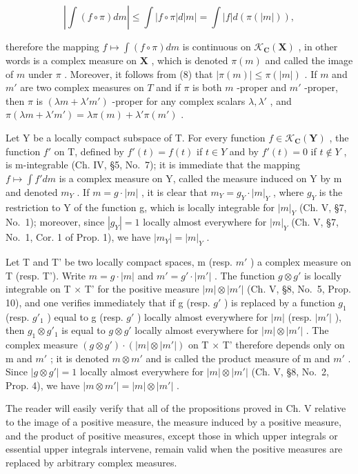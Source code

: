 \[
\left| \int (f \circ \pi) d m \right| \leqslant \int | f \circ \pi | d | m | = \int | f | d (\pi (| m |)),\tag{8}
\]

therefore the mapping \(f \mapsto \int (f \circ \pi) dm\) is continuous on \(\mathcal{K}_{\mathbf{C}}(\mathbf{X})\) , in other words is a complex measure on \(\mathbf{X}\) , which is denoted \(\pi(m)\) and called the image of \(m\) under \(\pi\) . Moreover, it follows from (8) that \(|\pi(m)| \leqslant \pi(|m|)\) . If \(m\) and \(m'\) are two complex measures on \(T\) and if \(\pi\) is both \(m\) -proper and \(m'\) -proper, then \(\pi\) is \((\lambda m + \lambda'm')\) -proper for any complex scalars \(\lambda, \lambda'\) , and \(\pi(\lambda m + \lambda'm') = \lambda\pi(m) + \lambda'\pi(m')\) .

Let Y be a locally compact subspace of T. For every function \(f \in \mathcal{K}_{\mathbf{C}}(\mathbf{Y})\) , the function \(f'\) on T, defined by \(f'(t) = f(t)\) if \(t \in Y\) and by \(f'(t) = 0\) if \(t \notin Y\) , is m-integrable (Ch. IV, §5, No.~7); it is immediate that the mapping \(f \mapsto \int f' dm\) is a complex measure on Y, called the measure induced on Y by m and denoted \(m_{Y}\) . If \(m = g \cdot |m|\) , it is clear that \(m_{Y} = g_{Y} \cdot |m|_{Y}\) , where \(g_{Y}\) is the restriction to Y of the function g, which is locally integrable for \(|m|_{Y}\) (Ch. V, §7, No.~1); moreover, since \(|g_{Y}| = 1\) locally almost everywhere for \(|m|_{Y}\) (Ch. V, §7, No.~1, Cor. 1 of Prop. 1), we have \(|m_{Y}| = |m|_{Y}\) .

Let T and T' be two locally compact spaces, m (resp. \(m'\) ) a complex measure on T (resp. T'). Write \(m = g \cdot |m|\) and \(m' = g' \cdot |m'|\) . The function \(g \otimes g'\) is locally integrable on T × T' for the positive measure \(|m| \otimes |m'|\) (Ch. V, §8, No.~5, Prop. 10), and one verifies immediately that if g (resp. \(g'\) ) is replaced by a function \(g_1\) (resp. \(g'_1\) ) equal to g (resp. \(g'\) ) locally almost everywhere for \(|m|\) (resp. \(|m'|\) ), then \(g_1 \otimes g'_1\) is equal to \(g \otimes g'\) locally almost everywhere for \(|m| \otimes |m'|\) . The complex measure \((g \otimes g') \cdot (|m| \otimes |m'|)\) on T × T' therefore depends only on m and \(m'\) ; it is denoted \(m \otimes m'\) and is called the product measure of m and \(m'\) . Since \(|g \otimes g'| = 1\) locally almost everywhere for \(|m| \otimes |m'|\) (Ch. V, §8, No.~2, Prop. 4), we have \(|m \otimes m'| = |m| \otimes |m'|\) .

The reader will easily verify that all of the propositions proved in Ch. V relative to the image of a positive measure, the measure induced by a positive measure, and the product of positive measures, except those in which upper integrals or essential upper integrals intervene, remain valid when the positive measures are replaced by arbitrary complex measures.

